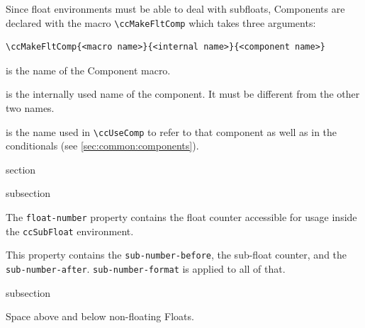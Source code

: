 Since float environments must be able to deal with subfloats,
Components are declared with the macro \lstinline{\ccMakeFltComp}
which takes three arguments:
\begin{lstlisting}[style=tex]
\ccMakeFltComp{<macro name>}{<internal name>}{<component name>}
\end{lstlisting}
\begin{description}[35mm]
\item[\texttt{<macro name>}] is the name of the Component macro.
\item[\texttt{<internal name>}] is the internally used name of the component. It must be different from the other two names.
\item[\texttt{<component name>}] is the name used in \lstinline{\ccUseComp} to refer to that component as well as in the conditionals (see \autoref{sec:common:components}).
\end{description}



\begin{Heading}[label=sec:flt:props]{section}
\end{Heading}


\begin{Heading}[label=sec:flt:props:undef]{subsection}
\end{Heading}


The \lstinline{float-number} property contains the float counter
accessible for usage inside the \lstinline{ccSubFloat} environment.


This property contains the \lstinline{sub-number-before}, the
sub-float counter, and the
\lstinline{sub-number-after}. \lstinline{sub-number-format} is applied
to all of that.



\begin{Heading}[label=sec:flt:spacing]{subsection}
\end{Heading}


Space above and below non-floating Floats.



